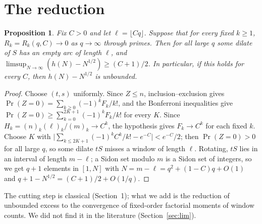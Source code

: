 \documentclass[11pt]{article}
\newtheorem{proposition}{Proposition}
\begin{document}
\section{The reduction}\label{sec:red}
\begin{proposition}\label{prop:red}
Fix $C>0$ and let $\ell=\lfloor Cq\rfloor$. Suppose that for every fixed $k\ge1$, $R_k=R_k(q,C)\to0$ as $q\to\infty$ through primes.
Then for all large $q$ some dilate of $S$ has an empty arc of length $\ell$, and $\limsup_{N\to\infty}(h(N)-N^{1/2})\ge(C+1)/2$.
In particular, if this holds for every $C$, then $h(N)-N^{1/2}$ is unbounded.
\end{proposition}
\begin{proof}
Choose $(t,s)$ uniformly. Since $Z\le n$, inclusion--exclusion gives $\Pr(Z=0)=\sum_{k\ge0}(-1)^kF_k/k!$, and the Bonferroni
inequalities give $\Pr(Z=0)\ge\sum_{k=0}^{2K+1}(-1)^kF_k/k!$ for every $K$. Since $H_k=(n)_k(\ell)_k/(m)_k\to C^k$, the hypothesis gives
$F_k\to C^k$ for each fixed $k$. Choose $K$ with $\bigl|\sum_{k\le2K+1}(-1)^kC^k/k!-e^{-C}\bigr|<e^{-C}/2$; then $\Pr(Z=0)>0$ for all
large $q$, so some dilate $tS$ misses a window of length $\ell$. Rotating, $tS$ lies in an interval of length $m-\ell$; a Sidon set
modulo $m$ is a Sidon set of integers, so we get $q+1$ elements in $[1,N]$ with $N=m-\ell=q^2+(1-C)q+O(1)$ and
$q+1-N^{1/2}=(C+1)/2+O(1/q)$.
\end{proof}
The cutting step is classical (Section~1); what we add is the reduction of unbounded excess to the convergence of fixed-order factorial
moments of window counts. We did not find it in the literature (Section~\ref{sec:lim}).
\end{document}
